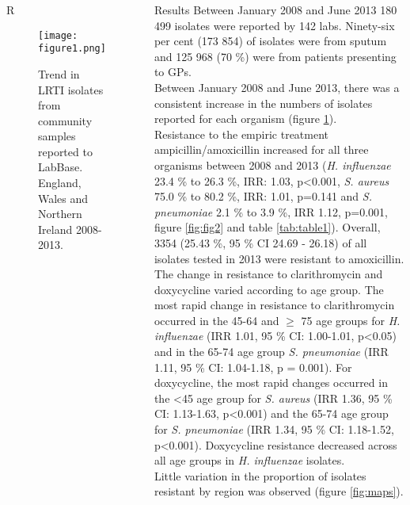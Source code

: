 \documentclass[final, 14pt]{beamer}
\begin{document}
\begin{frame}
\begin{columns}[t]
\begin{minipage}[t]{.95\textwidth}
\begin{block}{\textcolor{comp_blue}{R}}  
    \begin{figure}
   \texttt{[image: figure1.png]}
   \caption{Trend in LRTI isolates from community samples reported to LabBase. England, Wales and Northern Ireland 2008-2013.}
   \label{fig:fig1}
   \end{figure}

\end{block}  
\end{minipage}
  
 \begin{minipage}[t]{.95\textwidth} %
  \begin{block}{Results}
   Between January 2008 and June 2013 180 499 isolates were reported by 142 labs. 
   Ninety-six per cent (173 854) of isolates were from sputum and 125 968 (70 \%) were from patients presenting to GPs. \\
   Between January 2008 and June 2013, there was a consistent increase in the numbers of isolates reported for each organism (figure \ref{fig:fig1}).\\
Resistance to the empiric treatment ampicillin/amoxicillin increased for all three organisms between 2008 and 2013 (\textit{H. influenzae} 23.4 \% to 26.3 \%, IRR: 1.03, p\textless0.001, \textit{S. aureus} 75.0 \% to 80.2 \%, IRR: 1.01, p=0.141 and \textit{S. pneumoniae} 2.1 \% to 3.9 \%, IRR 1.12, p=0.001, figure \ref{fig:fig2} and table \ref{tab:table1}).
   Overall, 3354 (25.43 \%, 95 \% CI 24.69 - 26.18) of all isolates tested in 2013 were resistant to amoxicillin. \\
   The change in resistance to clarithromycin and doxycycline varied according to age group. 
   The most rapid change in resistance to clarithromycin occurred in the 45-64 and $\ge$ 75 age groups for \textit{H. influenzae} (IRR 1.01, 95 \% CI: 1.00-1.01, p\textless0.05) and in the 65-74 age group \textit{S. pneumoniae} (IRR 1.11, 95 \% CI: 1.04-1.18, p = 0.001). 
   For doxycycline, the most rapid changes occurred in the \textless 45 age group for \textit{S. aureus} (IRR 1.36, 95 \% CI: 1.13-1.63, p\textless0.001) and the 65-74 age group for \textit{S. pneumoniae} (IRR 1.34, 95 \% CI: 1.18-1.52, p\textless0.001). 
   Doxycycline resistance decreased across all age groups in \textit{H. influenzae} isolates.\\
   Little variation in the proportion of isolates resistant by region was observed (figure \ref{fig:maps}). 

\end{block}
\end{minipage}
\end{columns}
\end{frame}
\end{document}
